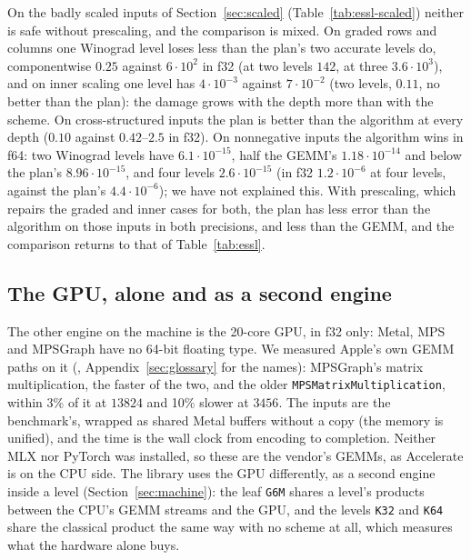 \documentclass[11pt]{article}
\newcommand{\lv}[1]{\texttt{#1}}
\begin{document}
On the badly scaled inputs of Section~\ref{sec:scaled}
(Table~\ref{tab:essl-scaled}) neither is safe without prescaling, and the
comparison is mixed.  On graded rows and columns one Winograd level loses
less than the plan's two accurate levels do, componentwise $0.25$ against
$6\cdot10^2$ in f32 (at two levels $142$, at three $3.6\cdot10^3$), and on inner
scaling one level has $4\cdot10^{-3}$ against $7\cdot10^{-2}$ (two levels,
$0.11$, no better than the plan): the damage grows with the depth more than with
the scheme.  On cross-structured inputs the plan is better than the
algorithm at every depth ($0.10$ against $0.42$--$2.5$ in f32).  On
nonnegative inputs the algorithm wins in f64: two Winograd levels have
$6.1\cdot10^{-15}$, half the GEMM's $1.18\cdot10^{-14}$ and below the plan's
$8.96\cdot10^{-15}$, and four levels $2.6\cdot10^{-15}$ (in f32
$1.2\cdot10^{-6}$ at four levels, against the plan's $4.4\cdot10^{-6}$); we
have not explained this.  With prescaling, which repairs the graded and inner
cases for both, the plan has less error than the algorithm on those
inputs in both precisions, and less than the GEMM, and the comparison returns to that of
Table~\ref{tab:essl}.

\subsection{The GPU, alone and as a second engine}\label{sec:gpu}

The other engine on the machine is the 20-core GPU, in f32 only: Metal, MPS
and MPSGraph have no 64-bit floating type.  We measured Apple's own GEMM paths
on it (, Appendix~\ref{sec:glossary} for the names):
MPSGraph's matrix multiplication, the faster of the two, and the older
\lv{MPSMatrixMultiplication}, within 3\% of it at $13824$ and 10\% slower at
$3456$.  The inputs are the benchmark's, wrapped as shared Metal buffers
without a copy (the memory is unified), and the time is the wall clock from
encoding to completion.  Neither MLX nor PyTorch was installed, so these are
the vendor's GEMMs, as Accelerate is on the CPU side.  The library uses the
GPU differently, as a second engine inside a level
(Section~\ref{sec:machine}): the leaf \lv{G6M} shares a level's products
between the CPU's GEMM streams and the GPU, and the levels \lv{K32} and
\lv{K64} share the classical product the same way with no scheme at all,
which measures what the hardware alone buys.
\end{document}
